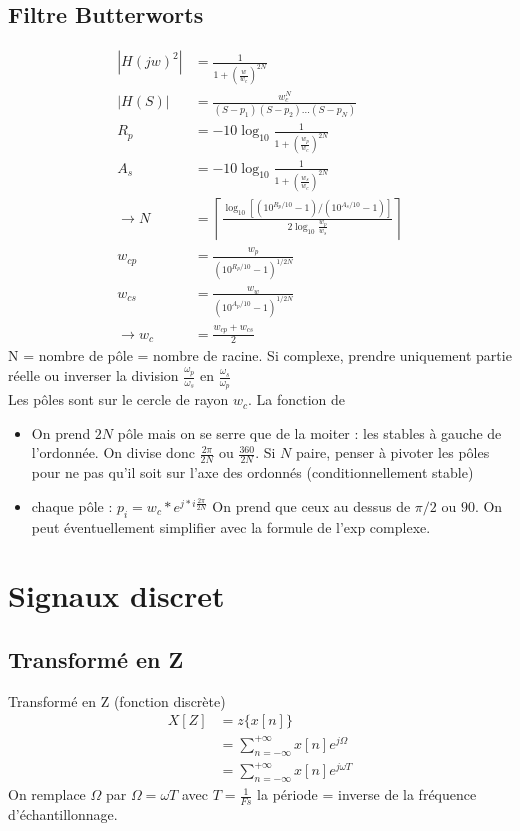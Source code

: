 \documentclass{article}
\theoremstyle{plain}%
\theoremstyle{definition}
\theoremstyle{remark}
\begin{document}
\subsection{Filtre Butterworts}
\begin{align*}
    \left| H(jw)^2 \right| &= \frac{1}{1+ (\frac{w}{w_c})^{2N}} \\
    \left| H(S) \right| &= \frac{w_c^N}{(S-p_1)(S-p_2)\dots(S-p_N)}\\
    R_p &= -10 \log_{10} \frac{1}{1 + (\frac{w_p}{w_c})^{2N}} \\
    A_s &= -10 \log_{10} \frac{1}{1 + (\frac{w_s}{w_c})^{2N}} \\
    \rightarrow N &= \left\lceil \frac{\log_{10} [(10^{R_p/10} - 1)/(10^{A_s/10} - 1)]}{2 \log_{10} \frac{w_p}{w_s}}\right\rceil \\
    w_{cp} &= \frac{w_p}{(10^{R_p/10} - 1)^{1/2N}} \\
    w_{cs} &= \frac{w_w}{(10^{A_p/10} - 1)^{1/2N}} \\
    \rightarrow w_c &= \frac{w_{cp} + w_{cs}}{2}
\end{align*}
N = nombre de pôle = nombre de racine. Si complexe, prendre uniquement partie réelle ou inverser la division $ \frac{\omega _p}{\omega _s} $ en $ \frac{\omega _s}{\omega _p} $ \\
Les pôles sont sur le cercle de rayon $ w_c $. La fonction de 
\begin{itemize}
    \item On prend $ 2N $ pôle mais on se serre que de la moiter : les stables à gauche de l'ordonnée. On divise donc $ \frac{2 \pi }{2N} $ ou $ \frac{360}{2N} $. Si $ N $ paire, penser à pivoter les pôles pour ne pas qu'il soit sur l'axe des ordonnés (conditionnellement stable)
    \item chaque pôle : $ p_i = w_c * e^{j * i \frac{2 \pi}{2N}} $ On prend que ceux au dessus de $ \pi /2 $ ou $ 90 $. On peut éventuellement simplifier avec la formule de l'exp complexe.
\end{itemize}


\section{Signaux discret}
\subsection{Transformé en Z}
Transformé en Z (fonction discrète) \begin{align*}
    X[Z] &= z\{x[n]\} \\ 
        &= \sum_{n=-\infty }^{+\infty }x[n]e^{j \Omega } \\
        &= \sum_{n=-\infty }^{+\infty }x[n]e^{j \omega T }
\end{align*}
On remplace $ \Omega  $ par $ \Omega = \omega T $ avec $ T = \frac{1}{Fs}$ la période = inverse de la fréquence d'échantillonnage.
\end{document}
